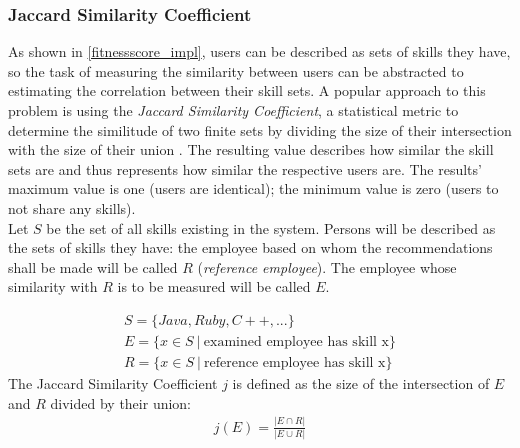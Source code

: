 \subsubsection{Jaccard Similarity Coefficient}
As shown in \ref{fitnessscore_impl}, users can be described as sets of skills they have, so the task of measuring the similarity between users can be abstracted to estimating the correlation between their skill sets. A popular approach to this problem is using the \textit{Jaccard Similarity Coefficient}, a statistical metric to determine the similitude of two finite sets by dividing the size of their intersection with the size of their union \cite{jaccard}. The resulting value describes how similar the skill sets are and thus represents how similar the respective users are. The results' maximum value is one (users are identical); the minimum value is zero (users to not share any skills).\\
Let $S$ be the set of all skills existing in the system. Persons will be described as the sets of skills they have: the employee based on whom the recommendations shall be made will be called $R$ (\textit{reference employee}). The employee whose similarity with $R$ is to be measured will be called $E$.

\begin{gather*}
	S = \{Java, Ruby, C++, ...\} \\
	E = \{x \in S \ | \ \textrm{examined employee has skill x}\} \\
	R = \{x \in S \ | \ \textrm{reference employee has skill x}\}
\end{gather*}
The Jaccard Similarity Coefficient $j$ is defined as the size of the intersection of $E$ and $R$ divided by their union:
\begin{gather*}
	j(E) = \frac{|E \cap R|}{|E \cup R|}
\end{gather*}

